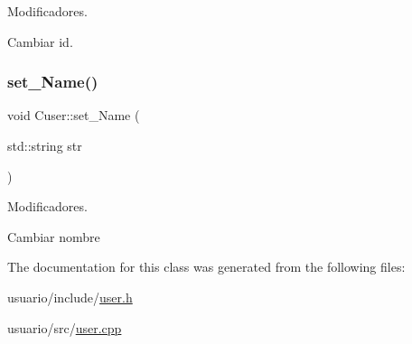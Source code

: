 Modificadores. 

Cambiar id. \mbox{\label{class_cuser_a08dc9670cd906182f42aea200e89dcbc}} 
\subsubsection{\texorpdfstring{set\+\_\+\+Name()}{set\_Name()}}
{\footnotesize\ttfamily void Cuser\+::set\+\_\+\+Name (\begin{DoxyParamCaption}\item[{std\+::string}]{str }\end{DoxyParamCaption})}



Modificadores. 

Cambiar nombre 

The documentation for this class was generated from the following files\+:\begin{DoxyCompactItemize}
\item 
usuario/include/\hyperlink{user_8h}{user.\+h}\item 
usuario/src/\hyperlink{user_8cpp}{user.\+cpp}\end{DoxyCompactItemize}
